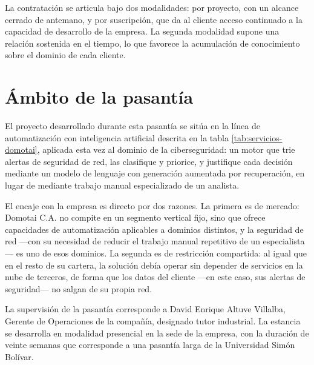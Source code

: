 La contratación se articula bajo dos modalidades: por proyecto, con un alcance cerrado de
antemano, y por suscripción, que da al cliente acceso continuado a la capacidad de desarrollo de
la empresa. La segunda modalidad supone una relación sostenida en el tiempo, lo que favorece la
acumulación de conocimiento sobre el dominio de cada cliente.

\section{Ámbito de la pasantía}

El proyecto desarrollado durante esta pasantía se sitúa en la línea de automatización con
inteligencia artificial descrita en la tabla \ref{tab:servicios-domotai}, aplicada esta vez al
dominio de la ciberseguridad: un motor que trie alertas de seguridad de red, las clasifique y
priorice, y justifique cada decisión mediante un modelo de lenguaje con generación aumentada por
recuperación, en lugar de mediante trabajo manual especializado de un analista.

El encaje con la empresa es directo por dos razones. La primera es de mercado: Domotai C.A. no
compite en un segmento vertical fijo, sino que ofrece capacidades de automatización aplicables a
dominios distintos, y la seguridad de red ---con su necesidad de reducir el trabajo manual repetitivo
de un especialista--- es uno de esos dominios. La segunda es de restricción compartida: al igual que
en el resto de su cartera, la solución debía operar sin depender de servicios en la nube de
terceros, de forma que los datos del cliente ---en este caso, sus alertas de seguridad--- no salgan de
su propia red.

La supervisión de la pasantía corresponde a David Enrique Altuve Villalba, Gerente de Operaciones
de la compañía, designado tutor industrial. La estancia se desarrolla en modalidad presencial en la
sede de la empresa, con la duración de veinte semanas que corresponde a una pasantía larga de la
Universidad Simón Bolívar.
